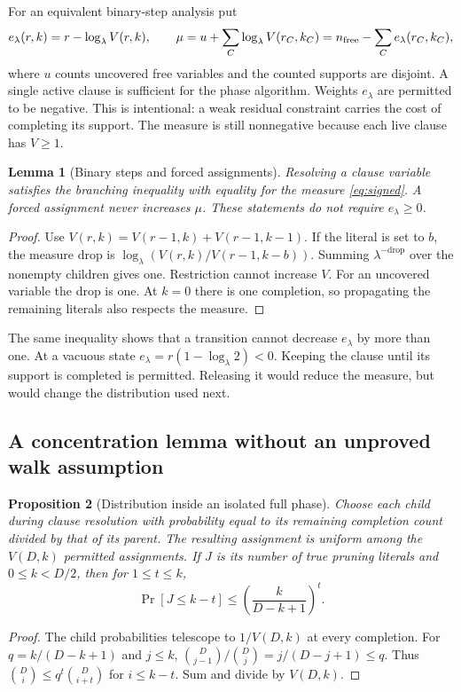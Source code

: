 \documentclass[11pt,a4paper]{article}
\newtheorem{proposition}{Proposition}
\newtheorem{lemma}[proposition]{Lemma}
\theoremstyle{remark}
\begin{document}
For an equivalent binary-step analysis put
\begin{equation}
 e_\lambda(r,k)=r-\log_\lambda V(r,k),\qquad
 \mu=u+\sum_C\log_\lambda V(r_C,k_C)
       =n_{\rm free}-\sum_C e_\lambda(r_C,k_C),                 \label{eq:signed}
\end{equation}
where $u$ counts uncovered free variables and the counted supports are
disjoint. A single active clause is sufficient for the phase algorithm.
Weights $e_\lambda$ are permitted to be negative. This is intentional:
a weak residual constraint carries the cost of completing its support.
The measure is still nonnegative because each live clause has $V\ge1$.

\begin{lemma}[Binary steps and forced assignments]
Resolving a clause variable satisfies the branching inequality with equality
for the measure \eqref{eq:signed}. A forced assignment never increases
$\mu$. These statements do not require $e_\lambda\ge0$.
\end{lemma}
\begin{proof}
Use $V(r,k)=V(r-1,k)+V(r-1,k-1)$. If the literal is set to $b$, the measure
drop is $\log_\lambda(V(r,k)/V(r-1,k-b))$. Summing $\lambda^{-\text{drop}}$
over the nonempty children gives one. Restriction cannot increase $V$.
For an uncovered variable the drop is one. At $k=0$ there is one completion,
so propagating the remaining literals also respects the measure.
\end{proof}

The same inequality shows that a transition cannot decrease $e_\lambda$
by more than one. At a vacuous state $e_\lambda=r(1-\log_\lambda2)<0$.
Keeping the clause until its support is completed is permitted. Releasing
it would reduce the measure, but would change the distribution used next.

\subsection{A concentration lemma without an unproved walk assumption}

\begin{proposition}[Distribution inside an isolated full phase]
Choose each child during clause resolution with probability equal to its
remaining completion count divided by that of its parent. The resulting
assignment is uniform among the $V(D,k)$ permitted assignments. If $J$ is
its number of true pruning literals and $0\le k<D/2$, then for $1\le t\le k$,
\begin{equation}
 \Pr[J\le k-t]\le
 \left(\frac{k}{D-k+1}\right)^t.                 \label{eq:tail}
\end{equation}
\end{proposition}
\begin{proof}
The child probabilities telescope to $1/V(D,k)$ at every completion.
For $q=k/(D-k+1)$ and $j\le k$,
$\binom D{j-1}/\binom Dj=j/(D-j+1)\le q$. Thus
$\binom D{i}\le q^t\binom D{i+t}$ for $i\le k-t$.
Sum and divide by $V(D,k)$.
\end{proof}
\end{document}
